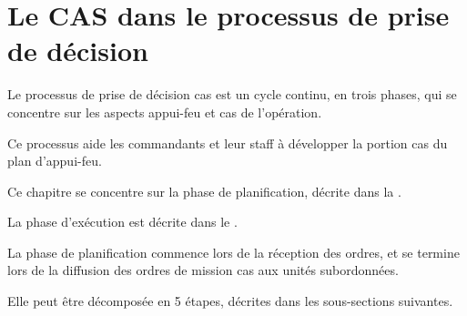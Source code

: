 \section{Le CAS dans le processus de prise de décision}

Le processus de prise de décision \gls{cas} est un cycle continu, en trois phases, qui se concentre sur les aspects appui-feu et \gls{cas} de l'opération.

Ce processus aide les commandants et leur staff à développer la portion \gls{cas} du plan d'appui-feu.

Ce chapitre se concentre sur la phase de planification, décrite dans la .

La phase d'exécution est décrite dans le .





La phase de planification commence lors de la réception des ordres, et se termine lors de la diffusion des ordres de mission \gls{cas} aux unités subordonnées.

Elle peut être décomposée en 5 étapes, décrites dans les sous-sections suivantes.

